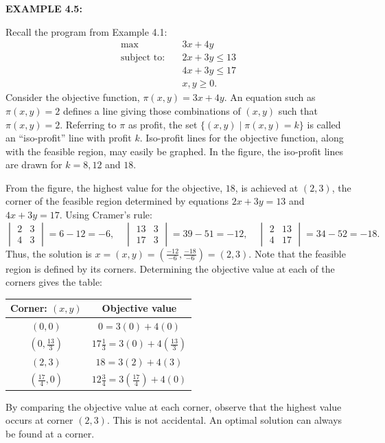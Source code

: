 \bigskip
\noindent\textbf{EXAMPLE 4.5:}
\begin{original}
Recall the program from Example 4.1:
\[
\begin{aligned}
\max \quad & 3x + 4y \\
\text{subject to:} \quad & 2x + 3y \le 13 \\
& 4x + 3y \le 17 \\
& x, y \ge 0.
\end{aligned}
\]
Consider the objective function, $\pi(x, y) = 3x + 4y$. An equation such as $\pi(x, y) = 2$ defines a line giving those combinations of $(x, y)$ such that $\pi(x, y) = 2$. Referring to $\pi$ as profit, the set $\{(x, y) \mid \pi(x, y) = k\}$ is called an ``iso-profit'' line with profit $k$. Iso-profit lines for the objective function, along with the feasible region, may easily be graphed. In the figure, the iso-profit lines are drawn for $k = 8, 12$ and $18$.

From the figure, the highest value for the objective, $18$, is achieved at $(2,3)$, the corner of the feasible region determined by equations $2x + 3y = 13$ and $4x + 3y = 17$. Using Cramer's rule:
\[
\begin{vmatrix} 2 & 3 \\ 4 & 3 \end{vmatrix} = 6 - 12 = -6,\quad
\begin{vmatrix} 13 & 3 \\ 17 & 3 \end{vmatrix} = 39 - 51 = -12,\quad
\begin{vmatrix} 2 & 13 \\ 4 & 17 \end{vmatrix} = 34 - 52 = -18.
\]
Thus, the solution is $x = (x, y) = \left(\frac{-12}{-6}, \frac{-18}{-6}\right) = (2,3)$. Note that the feasible region is defined by its corners. Determining the objective value at each of the corners gives the table:

\begin{center}
\begin{tabular}{cc}
Corner: $(x, y)$ & Objective value \\
\hline
$(0, 0)$ & $0 = 3(0) + 4(0)$ \\
$\left(0, \frac{13}{3}\right)$ & $17\frac{1}{3} = 3(0) + 4\left(\frac{13}{3}\right)$ \\
$(2, 3)$ & $18 = 3(2) + 4(3)$ \\
$\left(\frac{17}{4}, 0\right)$ & $12\frac{3}{4} = 3\left(\frac{17}{4}\right) + 4(0)$
\end{tabular}
\end{center}

By comparing the objective value at each corner, observe that the highest value occurs at corner $(2,3)$. This is not accidental. An optimal solution can always be found at a corner.
\end{original}
